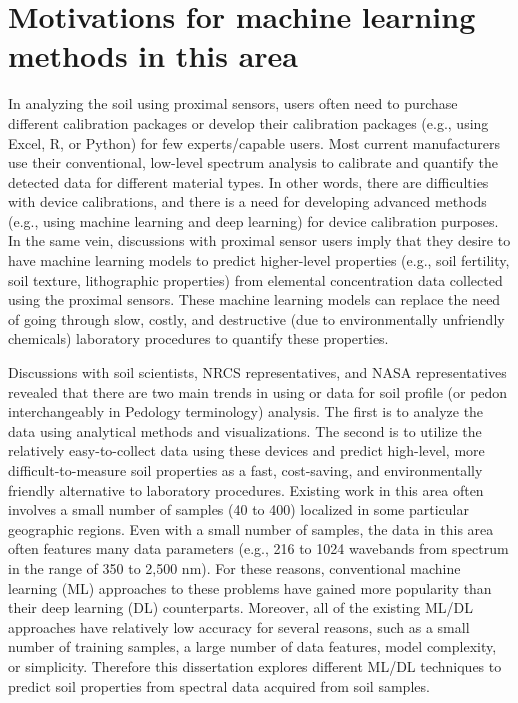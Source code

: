 \section{Motivations for machine learning methods in this area}

In analyzing the soil using proximal sensors, users often need to purchase different calibration packages or develop their calibration packages (e.g., using Excel, R, or Python) for few experts/capable users. Most current manufacturers use their conventional, low-level spectrum analysis to calibrate and quantify the detected data for different material types. In other words, there are difficulties with device calibrations, and there is a need for developing advanced methods (e.g., using machine learning and deep learning) for device calibration purposes. In the same vein, discussions with proximal sensor users imply that they desire to have machine learning models to predict higher-level properties (e.g., soil fertility, soil texture, lithographic properties) from elemental concentration data collected using the proximal sensors. These machine learning models can replace the need of going through slow, costly, and destructive (due to environmentally unfriendly chemicals) laboratory procedures to quantify these properties.

Discussions with soil scientists, NRCS representatives, and NASA representatives revealed that there are two main trends in using \pxrf{} or \visnir{} data for soil profile (or pedon interchangeably in Pedology terminology) analysis. The first is to analyze the data using analytical methods and visualizations. The second is to utilize the relatively easy-to-collect data using these devices and predict high-level, more difficult-to-measure soil properties as a fast, cost-saving, and environmentally friendly alternative to laboratory procedures. Existing work in this area often involves a small number of samples (40 to 400) localized in some particular geographic regions. Even with a small number of samples, the data in this area often features many data parameters (e.g., 216 to 1024 wavebands from \visnir{} spectrum in the range of 350 to 2,500 nm). For these reasons, conventional machine learning (ML) approaches to these problems have gained more popularity than their deep learning (DL) counterparts. Moreover, all of the existing ML/DL approaches have relatively low accuracy for several reasons, such as a small number of training samples, a large number of data features, model complexity, or simplicity. Therefore this dissertation explores different ML/DL techniques to predict soil properties from spectral data acquired from soil samples.

